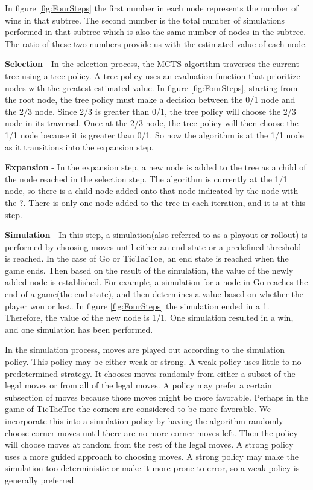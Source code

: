 \documentclass{sig-alternate}
\begin{document}
In figure \ref{fig:FourSteps} the first number in each node represents the number of wins in that subtree. The second number is the total number of simulations performed in that subtree which is also the same number of nodes in the subtree. The ratio of these two numbers provide us with the estimated value of each node.

\textbf{Selection} - In the selection process, the MCTS algorithm traverses the current tree using a tree policy. A tree policy uses an evaluation function that prioritize nodes with the greatest estimated value. In figure \ref{fig:FourSteps}, starting from the root node, the tree policy must make a decision between the 0/1 node and the 2/3 node. Since 2/3 is greater than 0/1, the tree policy will choose the 2/3 node in its traversal. Once at the 2/3 node, the tree policy will then choose the 1/1 node because it is greater than 0/1. So now the algorithm is at the 1/1 node as it transitions into the expansion step.

\textbf{Expansion} - In the expansion step, a new node is added to the tree as a child of the node reached in the selection step. The algorithm is currently at the 1/1 node, so there is a child node added onto that node indicated by the node with the ?. There is only one node added to the tree in each iteration, and it is at this step.

\textbf{Simulation} - In this step, a simulation(also referred to as a playout or rollout) is performed by choosing moves until either an end state or a predefined threshold is reached. In the case of Go or TicTacToe, an end state is reached when the game ends. Then based on the result of the simulation, the value of the newly added node is established. For example, a simulation for a node in Go reaches the end of a game(the end state), and then determines a value based on whether the player won or lost. In figure \ref{fig:FourSteps} the simulation ended in a 1. Therefore, the value of the new node is 1/1. One simulation resulted in a win, and one simulation has been performed.

In the simulation process, moves are played out according to the simulation policy\cite{ActionSelection}. This policy may be either weak or strong. A weak policy uses little to no predetermined strategy. It chooses moves randomly from either a subset of the legal moves or from all of the legal moves. A policy may prefer a certain subsection of moves because those moves might be more favorable. Perhaps in the game of TicTacToe the corners are considered to be more favorable. We incorporate this into a simulation policy by having the algorithm randomly choose corner moves until there are no more corner moves left. Then the policy will choose moves at random from the rest of the legal moves. A strong policy uses a more guided approach to choosing moves. A strong policy may make the simulation too deterministic or make it more prone to error\cite{TheGrandChallenge}, so a weak policy is generally preferred. 
\end{document}
